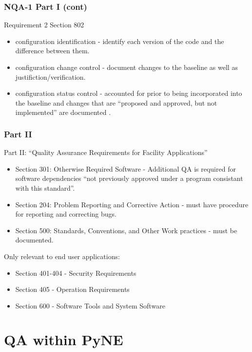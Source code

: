 \documentclass[12pt]{beamer}
\begin{document}
\begin{frame}
\frametitle{NQA-1 Part I (cont)}

Requirement 2 Section 802
\begin{itemize}
\item{\alert{configuration identification} - identify each version of the code and the difference between them.}
\item{\alert{configuration change control} - document changes to the baseline as well as justifiction/verification.}
\item{\alert{configuration status control} - accounted for prior to being incorporated into the baseline and changes that are “proposed and approved, but not implemented” are documented \cite{add}.}
\end{itemize}
\end{frame}

\begin{frame}
\frametitle{Part II}
Part II: ``Quality Assurance Requirements for Facility Applications''

\begin{itemize}
\item{Section 301: Otherwise Required Software - Additional QA is required for software dependencies ``not previously approved under a program consistant with this standard''.}
\item{Section 204: \alert{Problem Reporting} and \alert{Corrective Action} - must have procedure for reporting and correcting bugs}.
\item{Section 500: \alert{Standards}, \alert{Conventions}, and Other \alert{Work practices} - must be documented.}
\end{itemize}

Only relevant to end user applications:
\begin{itemize}
\item{Section 401-404 - Security Requirements}
\item{Section 405 - Operation Requirements}
\item{Section 600 - Software Tools and System Software}
\end{itemize}
\end{frame}



\section{QA within PyNE}
\end{document}
